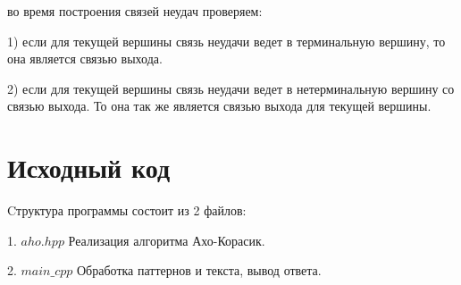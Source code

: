 во время построения связей неудач проверяем:

1) если для текущей вершины связь неудачи ведет в терминальную вершину, то она является связью выхода.

2) если для текущей вершины связь неудачи ведет в нетерминальную вершину со связью выхода. То она так же является связью выхода
для текущей вершины.


\pagebreak

\section{Исходный код}

Cтруктура программы состоит из 2 файлов:

1. $aho.hpp$ Реализация алгоритма Ахо-Корасик.

2. $main\_cpp$ Обработка паттернов и текста, вывод ответа.

